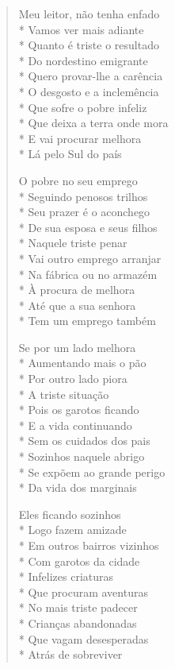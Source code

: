 \begin{verse}
Meu leitor, não tenha enfado\\*
Vamos ver mais adiante\\*
Quanto é triste o resultado\\*
Do nordestino emigrante\\*
Quero provar-lhe a carência\\*
O desgosto e a inclemência\\*
Que sofre o pobre infeliz\\*
Que deixa a terra onde mora\\*
E vai procurar melhora\\*
Lá pelo Sul do país

O pobre no seu emprego\\*
Seguindo penosos trilhos\\*
Seu prazer é o aconchego\\*
De sua esposa e seus filhos\\*
Naquele triste penar\\*
Vai outro emprego arranjar\\*
Na fábrica ou no armazém\\*
À procura de melhora\\*
Até que a sua senhora\\*
Tem um emprego também

Se por um lado melhora\\*
Aumentando mais o pão\\*
Por outro lado piora\\*
A triste situação\\*
Pois os garotos ficando\\*
E a vida continuando\\*
Sem os cuidados dos pais\\*
Sozinhos naquele abrigo\\*
Se expõem ao grande perigo\\*
Da vida dos marginais

Eles ficando sozinhos\\*
Logo fazem amizade\\*
Em outros bairros vizinhos\\*
Com garotos da cidade\\*
Infelizes criaturas\\*
Que procuram aventuras\\*
No mais triste padecer\\*
Crianças abandonadas\\*
Que vagam desesperadas\\*
Atrás de sobreviver


\end{verse}
